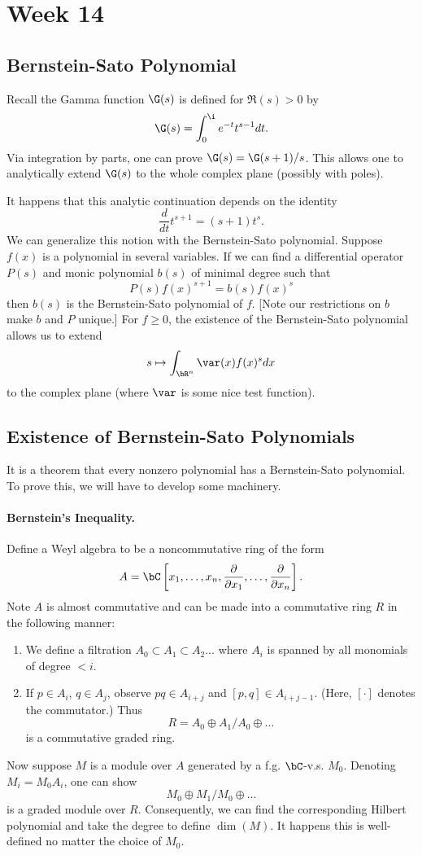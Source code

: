 \section{Week 14}

\subsection{Bernstein-Sato Polynomial}
Recall the Gamma function $\G(s)$ is defined for $\Re(s) > 0$ by
\[
    \G(s) = \int_0^\i e^{-t}t^{s-1}dt.
\]
Via integration by parts, one can prove $\G(s) = \G(s+1)/s$. This allows one to analytically extend $\G(s)$ to the whole complex plane (possibly with poles).

It happens that this analytic continuation depends on the identity
\[
    \frac{d}{dt}t^{s+1} = (s+1)t^s.
\]
We can generalize this notion with the Bernstein-Sato polynomial. Suppose $f(x)$ is a polynomial in several variables. If we can find a differential operator $P(s)$ and monic polynomial $b(s)$ of minimal degree such that
\[
    P(s)f(x)^{s+1} = b(s)f(x)^s
\]
then $b(s)$ is the Bernstein-Sato polynomial of $f$. [Note our restrictions on $b$ make $b$ and $P$ unique.] For $f \geq 0$, the existence of the Bernstein-Sato polynomial allows us to extend
\[
    s \mapsto \int_{\bR^n}\var(x)f(x)^s dx
\]
to the complex plane (where $\var$ is some nice test function).

\subsection{Existence of Bernstein-Sato Polynomials}
It is a theorem that every nonzero polynomial has a Bernstein-Sato polynomial. To prove this, we will have to develop some machinery.

\paragraph{Bernstein's Inequality.} Define a Weyl algebra to be a noncommutative ring of the form
\[
    A = \bC\left[ x_1, \dots, x_n, \frac{\partial}{\partial x_1}, \dots, \frac{\partial}{\partial x_n}  \right].
\]
Note $A$ is almost commutative and can be made into a commutative ring $R$ in the following manner:
\begin{enumerate}
    \item We define a filtration $A_0 \subset A_1 \subset A_2 \dots$ where $A_i$ is spanned by all monomials of degree $< i$.
    \item If $p \in A_i$, $q \in A_j$, observe $pq \in A_{i + j}$ and $[p,q] \in A_{i + j -1}$. (Here, $[\cdot]$ denotes the commutator.) Thus
    \[
        R = A_0 \oplus A_1/A_0 \oplus \dots
    \]
    is a commutative graded ring.
\end{enumerate}
Now suppose $M$ is a module over $A$ generated by a f.g. $\bC$-v.s. $M_0$. Denoting $M_i = M_0A_i$, one can show
\[
    M_0 \oplus M_1/M_0 \oplus \dots
\]
is a graded module over $R$. Consequently, we can find the corresponding Hilbert polynomial and take the degree to define $\dim(M)$. It happens this is well-defined no matter the choice of $M_0$.

